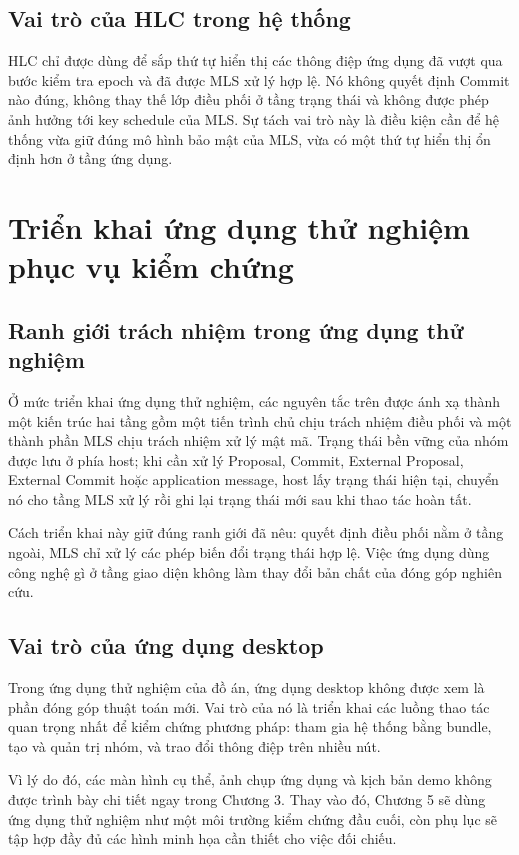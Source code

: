 \documentclass[../DoAn.tex]{subfiles}
\begin{document}
\subsection{Vai trò của HLC trong hệ thống}

HLC chỉ được dùng để sắp thứ tự hiển thị các thông điệp ứng dụng đã vượt qua bước kiểm tra epoch và đã được MLS xử lý hợp lệ. Nó không quyết định Commit nào đúng, không thay thế lớp điều phối ở tầng trạng thái và không được phép ảnh hưởng tới key schedule của MLS. Sự tách vai trò này là điều kiện cần để hệ thống vừa giữ đúng mô hình bảo mật của MLS, vừa có một thứ tự hiển thị ổn định hơn ở tầng ứng dụng.

\section{Triển khai ứng dụng thử nghiệm phục vụ kiểm chứng}
\label{sec:prototype-demo}

\subsection{Ranh giới trách nhiệm trong ứng dụng thử nghiệm}

Ở mức triển khai ứng dụng thử nghiệm, các nguyên tắc trên được ánh xạ thành một kiến trúc hai tầng gồm một tiến trình chủ chịu trách nhiệm điều phối và một thành phần MLS chịu trách nhiệm xử lý mật mã. Trạng thái bền vững của nhóm được lưu ở phía host; khi cần xử lý Proposal, Commit, External Proposal, External Commit hoặc application message, host lấy trạng thái hiện tại, chuyển nó cho tầng MLS xử lý rồi ghi lại trạng thái mới sau khi thao tác hoàn tất.

Cách triển khai này giữ đúng ranh giới đã nêu: quyết định điều phối nằm ở tầng ngoài, MLS chỉ xử lý các phép biến đổi trạng thái hợp lệ. Việc ứng dụng dùng công nghệ gì ở tầng giao diện không làm thay đổi bản chất của đóng góp nghiên cứu.

\subsection{Vai trò của ứng dụng desktop}

Trong ứng dụng thử nghiệm của đồ án, ứng dụng desktop không được xem là phần đóng góp thuật toán mới. Vai trò của nó là triển khai các luồng thao tác quan trọng nhất để kiểm chứng phương pháp: tham gia hệ thống bằng bundle, tạo và quản trị nhóm, và trao đổi thông điệp trên nhiều nút.

Vì lý do đó, các màn hình cụ thể, ảnh chụp ứng dụng và kịch bản demo không được trình bày chi tiết ngay trong Chương 3. Thay vào đó, Chương 5 sẽ dùng ứng dụng thử nghiệm như một môi trường kiểm chứng đầu cuối, còn phụ lục sẽ tập hợp đầy đủ các hình minh họa cần thiết cho việc đối chiếu.
\end{document}
